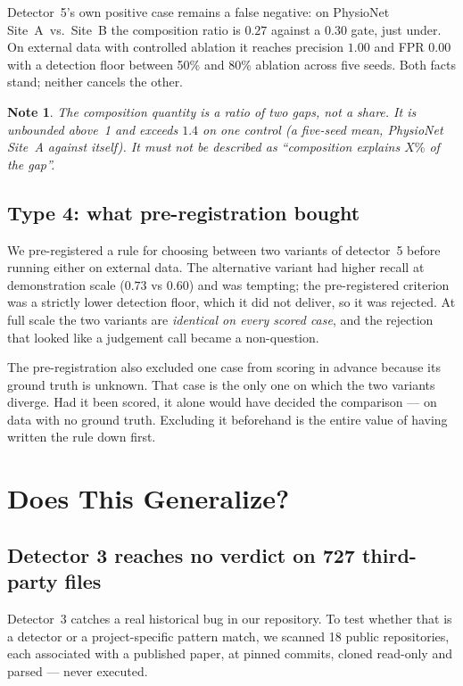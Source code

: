 \documentclass[pmlr,twocolumn,10pt]{jmlr}
\newtheorem*{note}{Note}
\begin{document}
Detector~5's own positive case remains a false negative: on PhysioNet
Site~A~vs.~Site~B the composition ratio is $0.27$ against a $0.30$ gate, just
under. On external data with controlled ablation it reaches precision $1.00$ and
FPR $0.00$ with a detection floor between 50\% and 80\% ablation across five
seeds. Both facts stand; neither cancels the other.

\begin{note}
The composition quantity is a \emph{ratio of two gaps}, not a share. It is
unbounded above~1 and exceeds $1.4$ on one control (a five-seed mean, PhysioNet
Site~A against itself). It must not be described as
``composition explains $X\%$ of the gap''.
\end{note}

\subsection{Type 4: what pre-registration bought}

We pre-registered a rule for choosing between two variants of detector~5 before
running either on external data. The alternative variant had higher recall at demonstration scale
($0.73$ vs $0.60$) and was tempting; the pre-registered criterion was a strictly
lower detection floor, which it did not deliver, so it was rejected. At full
scale the two variants are \emph{identical on every scored case}, and the
rejection that looked like a judgement call became a non-question.

The pre-registration also excluded one case from scoring in advance because its
ground truth is unknown. That case is the only one on which the two variants
diverge. Had it been scored, it alone would have decided the comparison --- on
data with no ground truth. Excluding it beforehand is the entire value of having
written the rule down first.

\section{Does This Generalize?}
\label{sec:generalize}

\subsection{Detector 3 reaches no verdict on 727 third-party files}

Detector~3 catches a real historical bug in our repository. To test whether that
is a detector or a project-specific pattern match, we scanned 18 public
repositories, each associated with a published paper, at pinned commits, cloned
read-only and parsed --- never executed.
\end{document}
